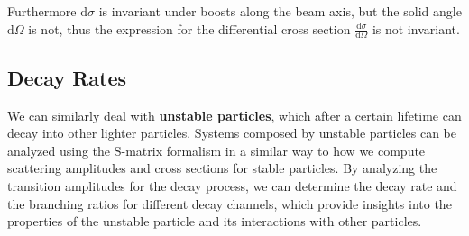 \begin{example}
\begin{remark}
        Furthermore \(\mathrm{d} \sigma\) is invariant under boosts along the beam axis, but the solid angle \(\mathrm{d} \Omega\) is not, thus the expression for the differential cross section \(\tfrac{\mathrm{d} \sigma}{\mathrm{d} \Omega}\) is not invariant.
    \end{remark}
\end{example}

\subsection{Decay Rates}

We can similarly deal with \textbf{unstable particles}, which after a certain lifetime can decay into other lighter particles. Systems composed by unstable particles can be analyzed using the S-matrix formalism in a similar way to how we compute scattering amplitudes and cross sections for stable particles.
By analyzing the transition amplitudes for the decay process, we can determine the decay rate and the branching ratios for different decay channels, which provide insights into the properties of the unstable particle and its interactions with other particles.

